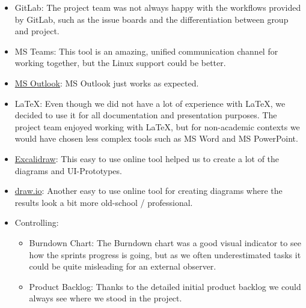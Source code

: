 \begin{itemize}
    \item GitLab: The project team was not always happy with the workflows provided by GitLab, such as the issue boards and the differentiation between group and project.
    \item MS Teams: This tool is an amazing, unified communication channel for working together, but the Linux support could be better.
    \item \href{https://www.microsoft.com/en-us/microsoft-365/outlook/email-and-calendar-software-microsoft-outlook}{MS Outlook}: MS Outlook just works as expected.
    \item LaTeX: Even though we did not have a lot of experience with LaTeX, we decided to use it for all documentation and presentation purposes.
          The project team enjoyed working with LaTeX, but for non-academic contexts we would have chosen less complex tools such as MS Word and MS PowerPoint.
    \item \href{https://excalidraw.com/}{Excalidraw}: This easy to use online tool helped us to create a lot of the diagrams and UI-Prototypes.
    \item \href{https://www.drawio.com/}{draw.io}: Another easy to use online tool for creating diagrams where the results look a bit more old-school / professional.
    \item Controlling:
          \begin{itemize}
              \item Burndown Chart: The Burndown chart was a good visual indicator to see how the sprints progress is going, but as we often underestimated tasks it could be quite misleading for an external observer.
              \item Product Backlog: Thanks to the detailed initial product backlog we could always see where we stood in the project.
          \end{itemize}
\end{itemize}
